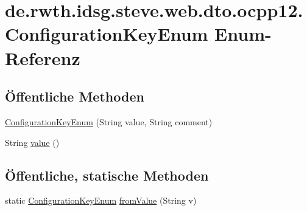 \hypertarget{enumde_1_1rwth_1_1idsg_1_1steve_1_1web_1_1dto_1_1ocpp12_1_1_configuration_key_enum}{\section{de.\-rwth.\-idsg.\-steve.\-web.\-dto.\-ocpp12.\-Configuration\-Key\-Enum Enum-\/\-Referenz}
\label{enumde_1_1rwth_1_1idsg_1_1steve_1_1web_1_1dto_1_1ocpp12_1_1_configuration_key_enum}
}
\subsection*{Öffentliche Methoden}
\begin{DoxyCompactItemize}
\item 
\hyperlink{enumde_1_1rwth_1_1idsg_1_1steve_1_1web_1_1dto_1_1ocpp12_1_1_configuration_key_enum_a55ac9e316f1d678ac308a25fe76bf2e0}{Configuration\-Key\-Enum} (String value, String comment)
\item 
String \hyperlink{enumde_1_1rwth_1_1idsg_1_1steve_1_1web_1_1dto_1_1ocpp12_1_1_configuration_key_enum_a98a7a4f3a4ce62c7b6c3bd0f374921b3}{value} ()
\end{DoxyCompactItemize}
\subsection*{Öffentliche, statische Methoden}
\begin{DoxyCompactItemize}
\item 
static \hyperlink{enumde_1_1rwth_1_1idsg_1_1steve_1_1web_1_1dto_1_1ocpp12_1_1_configuration_key_enum}{Configuration\-Key\-Enum} \hyperlink{enumde_1_1rwth_1_1idsg_1_1steve_1_1web_1_1dto_1_1ocpp12_1_1_configuration_key_enum_a77a10114ee142333bc38006bfe72d459}{from\-Value} (String v)
\end{DoxyCompactItemize}
